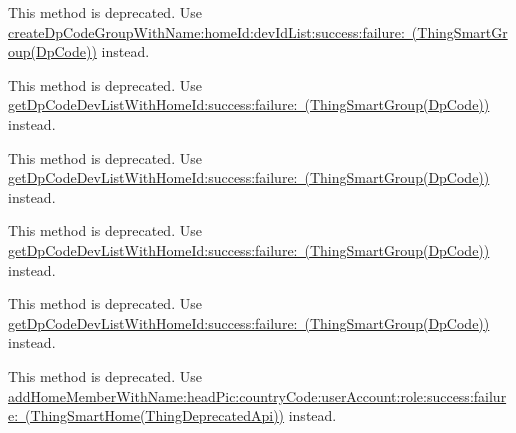 \begin{DoxyRefList}
\label{deprecated__deprecated000004}%
%
This method is deprecated. Use \mbox{\hyperlink{category_thing_smart_group_07_dp_code_08_a77b789fd26bba75504b33384b9157b92}{create\+Dp\+Code\+Group\+With\+Name\+:home\+Id\+:dev\+Id\+List\+:success\+:failure\+: (\+Thing\+Smart\+Group(\+Dp\+Code))}} instead.  
\item[(Dp\+Code) Member \mbox{\hyperlink{category_thing_smart_group_07_dp_code_08_a46dad7e6843dbafee794b7e9320de4a5}{\mbox{[}Thing\+Smart\+Group(Dp\+Code) get\+Dp\+Code\+Dev\+List\+With\+Home\+Id\+:category\+Code\+:success\+:failure\+:\mbox{]}}} ]\label{deprecated__deprecated000023}%
%
This method is deprecated. Use \mbox{\hyperlink{category_thing_smart_group_07_dp_code_08_a96f4f4857334fe09c5a1484b601ee445}{get\+Dp\+Code\+Dev\+List\+With\+Home\+Id\+:success\+:failure\+: (\+Thing\+Smart\+Group(\+Dp\+Code))}} instead. 

\label{deprecated__deprecated000005}%
%
This method is deprecated. Use \mbox{\hyperlink{category_thing_smart_group_07_dp_code_08_a96f4f4857334fe09c5a1484b601ee445}{get\+Dp\+Code\+Dev\+List\+With\+Home\+Id\+:success\+:failure\+: (\+Thing\+Smart\+Group(\+Dp\+Code))}} instead. 

\label{deprecated__deprecated000041}%
%
This method is deprecated. Use \mbox{\hyperlink{category_thing_smart_group_07_dp_code_08_a96f4f4857334fe09c5a1484b601ee445}{get\+Dp\+Code\+Dev\+List\+With\+Home\+Id\+:success\+:failure\+: (\+Thing\+Smart\+Group(\+Dp\+Code))}} instead. 

\label{deprecated__deprecated000059}%
%
This method is deprecated. Use \mbox{\hyperlink{category_thing_smart_group_07_dp_code_08_a96f4f4857334fe09c5a1484b601ee445}{get\+Dp\+Code\+Dev\+List\+With\+Home\+Id\+:success\+:failure\+: (\+Thing\+Smart\+Group(\+Dp\+Code))}} instead.  
\item[(Thing\+Deprecated\+Api) Member \mbox{\hyperlink{category_thing_smart_home_07_thing_deprecated_api_08_aa06ed0850cb14733eb33f539a81e0650}{\mbox{[}Thing\+Smart\+Home(Thing\+Deprecated\+Api) add\+Home\+Member\+With\+Name\+:head\+Pic\+:country\+Code\+:user\+Account\+:is\+Admin\+:success\+:failure\+:\mbox{]}}} ]\label{deprecated__deprecated000007}%
%
This method is deprecated. Use \mbox{\hyperlink{category_thing_smart_home_07_thing_deprecated_api_08_ab4ef49d6ad98738dfbe78948ba41d7e2}{add\+Home\+Member\+With\+Name\+:head\+Pic\+:country\+Code\+:user\+Account\+:role\+:success\+:failure\+: (\+Thing\+Smart\+Home(\+Thing\+Deprecated\+Api))}} instead. 


\end{DoxyRefList}
